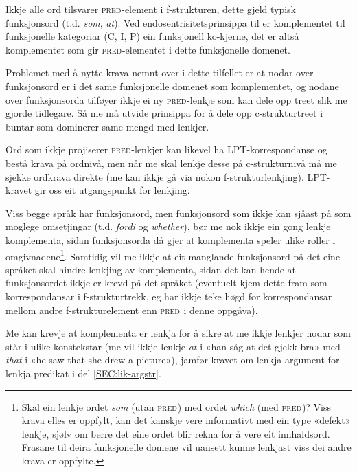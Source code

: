 \documentclass[11pt,a4paper,oneside,draft]{book}
\newcommand{\F}[2]{\textsc{#1}\ensuremath{_{#2}}}
\newcommand{\PRED}{\F{pred}{}}
\begin{document}
\label{SEC:fnord}

Ikkje alle ord tilsvarer \PRED{}-element i f-strukturen, dette gjeld
typisk funksjonsord (t.d. \emph{som}, \emph{at}). 
Ved endosentrisitetsprinsippa
til \citet{bresnan2001lfs} er komplementet til funksjonelle kategoriar
(C, I, P) ein funksjonell ko-kjerne, det er altså komplementet som gir
\PRED{}-elementet i dette funksjonelle domenet.

Problemet med å nytte krava nemnt over i dette tilfellet er at nodar
over funksjonsord er i det same funksjonelle domenet som komplementet,
og nodane over funksjonsorda tilføyer ikkje ei ny \PRED{}-lenkje som kan
dele opp treet slik me gjorde tidlegare. Så me må utvide prinsippa for
å dele opp c-strukturtreet i buntar som dominerer same mengd med
lenkjer.

Ord som ikkje projiserer \PRED{}-lenkjer kan likevel ha
LPT-korrespondanse og bestå krava på ordnivå, men når me skal lenkje
desse på c-strukturnivå må me sjekke ordkrava direkte (me kan ikkje gå
via nokon f-strukturlenkjing). LPT-kravet gir oss eit utgangspunkt for
lenkjing.

Viss begge språk har funksjonsord, men funksjonsord som ikkje kan
sjåast på som moglege omsetjingar (t.d. \emph{fordi} og \emph{whether}), bør me
nok ikkje ein gong lenkje komplementa, sidan funksjonsorda då gjer at
komplementa speler ulike roller i omgivnadene\footnote{Skal ein lenkje ordet \emph{som} (utan \PRED{}) med ordet \emph{which} (med
        \PRED{})? Viss krava elles er oppfylt, kan det kanskje vere
        informativt med ein type «defekt» lenkje, sjølv om berre det
        eine ordet blir rekna for å vere eit innhaldsord. Frasane til
        deira funksjonelle domene vil uansett kunne lenkjast viss dei andre
        krava er oppfylte. }. Samtidig vil me
ikkje at eit manglande funksjonsord på det eine språket skal hindre
lenkjing av komplementa, sidan det kan hende at funksjonsordet ikkje
er krevd på det språket (eventuelt kjem dette fram som korrespondansar
i f-strukturtrekk, eg har ikkje teke høgd for korrespondansar mellom
andre f-strukturelement enn \PRED{} i denne oppgåva).

Me kan krevje at komplementa er lenkja for å sikre at me ikkje lenkjer
nodar som står i ulike konstekstar (me vil ikkje lenkje \emph{at} i «han
såg at det gjekk bra» med \emph{that} i «he saw that she drew a picture»),
jamfør kravet om lenkja argument for lenkja predikat i del
\ref{SEC:lik-argstr}.
\end{document}
